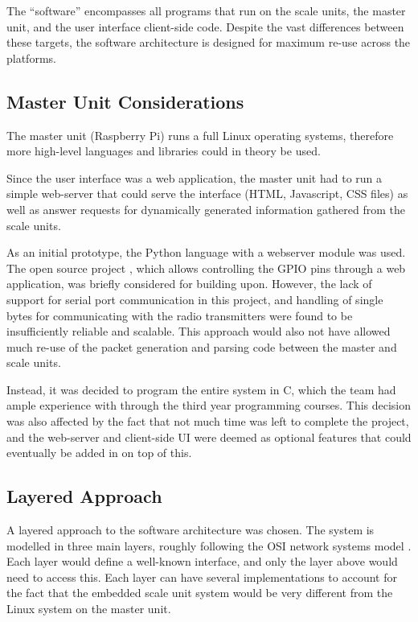 The ``software'' encompasses all programs that run on the scale units, the master unit, and the user interface client-side code. Despite the vast differences between these targets, the software architecture is designed for maximum re-use across the platforms.


\subsection{Master Unit Considerations}
The master unit (Raspberry Pi) runs a full Linux operating systems, therefore more high-level languages and libraries could in theory be used.

Since the user interface was a web application, the master unit had to run a simple web-server that could serve the interface (HTML, Javascript, CSS files) as well as answer requests for dynamically generated information gathered from the scale units.

As an initial prototype, the Python language with a webserver module \cite{bottle-py} was used. The open source project \cite{webiopi}, which allows controlling the GPIO pins through a web application, was briefly considered for building upon. However, the lack of support for serial port communication in this project, and handling of single bytes for communicating with the radio transmitters were found to be insufficiently reliable and scalable. This approach would also not have allowed much re-use of the packet generation and parsing code between the master and scale units.

Instead, it was decided to program the entire system in C, which the team had ample experience with through the third year programming courses. This decision was also affected by the fact that not much time was left to complete the project, and the web-server and client-side UI were deemed as optional features that could eventually be added in on top of this.

\subsection{Layered Approach}
A layered approach to the software architecture was chosen. The system is modelled in three main layers, roughly following the OSI network systems model \cite{osi-model}. Each layer would define a well-known interface, and only the layer above would need to access this. Each layer can have several implementations to account for the fact that the embedded scale unit system would be very different from the Linux system on the master unit.

